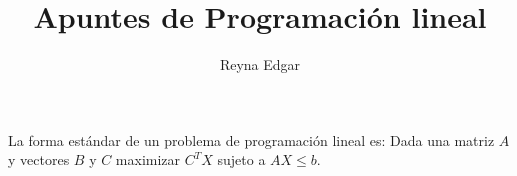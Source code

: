 \documentclass{article}
\title{Apuntes de Programación lineal}
\author{Reyna Edgar}
\begin{document}
\maketitle

La forma estándar de un problema de programación lineal es:
Dada una matriz $A$ y vectores $B$ y $C$ maximizar $C^TX$ sujeto a
$AX\leq b$.
\end{document}
